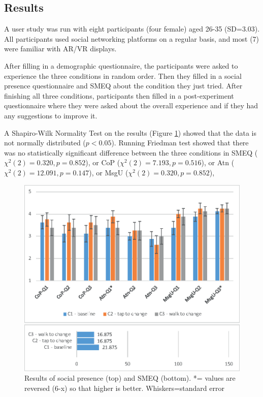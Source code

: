 \subsection{Results}

A user study was run with eight participants (four female) aged 26-35 (SD=3.03). All participants used social networking platforms on a regular basis, and most (7) were familiar with AR/VR displays. 

After filling in a demographic questionnaire, the participants were asked to experience the three conditions in random order. Then they filled in a social presence questionnaire and SMEQ about the condition they just tried. After finishing all three conditions, participants then filled in a post-experiment questionnaire where they were asked about the overall experience and if they had any suggestions to improve it. 

A Shapiro-Wilk Normality Test on the results (Figure \ref{fig:data:results}) showed that the data is not normally distributed ($p<0.05$). Running Friedman test showed that there was no statistically significant difference between the three conditions in SMEQ ($χ^2(2)=0.320, p=0.852$), or CoP ($χ^2(2)=7.193, p=0.516$), or Atn ($χ^2(2)=12.091, p=0.147$), or MsgU ($χ^2(2)=0.320, p=0.852$), 


\begin{figure}[h]
  \centering
  \includegraphics[width=\columnwidth]{images/chi/images-01.eps}
  \caption{Results of social presence (top) and SMEQ (bottom). *= values are reversed (6-x) so that higher is better. Whiskers=standard error}
  \label{fig:data:results}
\end{figure}

